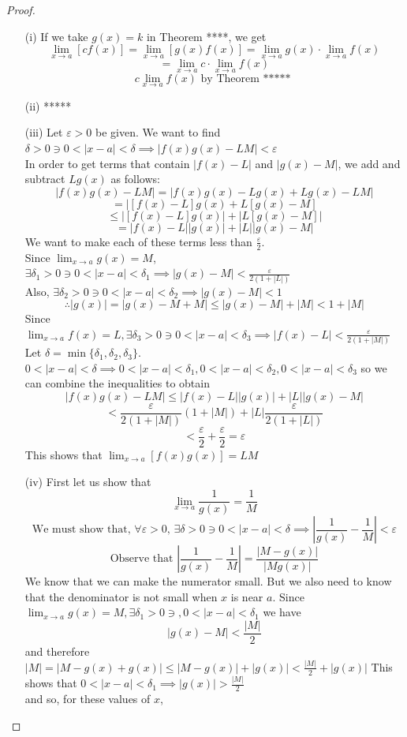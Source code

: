 \documentclass[10pt]{report}
\newcommand{\eps}{\varepsilon}
\begin{document}
\begin{proof}
\begin{itemize}
\item[(i)] If we take $g(x)=k$ in Theorem ****, we get
$$\lim_{x\to a}[cf(x)] =\lim_{x\to a}[g(x)f(x)] =\lim_{x\to a}g(x) \cdot\lim_{x\to a}f(x)$$
$$=\lim_{x\to a}c \cdot\lim_{x\to a}f(x)$$
$$c\lim_{x\to a}f(x)\text{ by Theorem ***** }$$
\item[(ii)]*****
\item[(iii)] Let $\eps>0$ be given. We want to find $\delta>0\ni 0<|x-a| < \delta \implies |f(x)g(x)-LM|<\eps$\\
In order to get terms that contain $|f(x)-L|$ and $|g(x)-M|$, we add and subtract $Lg(x)$ as follows:
$$|f(x)g(x)-LM|=|f(x)g(x)-Lg(x)+Lg(x)-LM|$$
$$=|[f(x)-L]g(x)+L[g(x)-M]$$
$$\leq |[f(x)-L]g(x)|+|L[g(x)-M]|$$
$$=|f(x)-L||g(x)|+|L||g(x)-M|$$
We want to make each of these terms less than $\frac{\eps}{2}$.\\
Since $\lim_{x\to a}g(x)=M$, $\exists\delta_1>0\ni 0<|x-a|<\delta_1\implies |g(x)-M|<\frac{\eps}{2(1+|L|)}$\\
Also, $\exists \delta_2>0\ni 0<|x-a|<\delta_2\implies |g(x)-M|<1$\\
$$\therefore |g(x)|=|g(x)-M+M|\leq |g(x)-M|+|M|<1+|M|$$
Since $\lim_{x\to a}f(x)=L, \exists\delta_3>0\ni 0<|x-a|<\delta_3 \implies |f(x)-L|<\frac{\eps}{2(1+|M|)}$\\
Let $\delta=\min\{\delta_1,\delta_2, \delta_3\}$. $0<|x-a|<\delta\implies 0<|x-a|<\delta_1, 0<|x-a|<\delta_2, 0<|x-a|<\delta_3$ so we can combine the inequalities to obtain
$$|f(x)g(x)-LM|\leq |f(x)-L||g(x)|+|L||g(x)-M|$$
$$<\frac{\eps}{2(1+|M|)}(1+|M|)+|L|\frac{\eps}{2(1+|L|)}$$
$$<\frac{\eps}{2}+\frac{\eps}{2}=\eps$$
This shows that $\lim_{x\to a}[f(x)g(x)]=LM$ 
\item[(iv)] First let us show that
$$\lim_{x\to a}\frac{1}{g(x)}=\frac{1}{M}$$
$$\text{We must show that, } \forall\eps>0\text{, }\exists \delta>0\ni 0<|x-a|<\delta \implies \left|\frac{1}{g(x)}-\frac{1}{M} \right|<\eps$$
$$\text{Observe that }\left|\frac{1}{g(x)}-\frac{1}{M} \right|=\frac{|M-g(x)|}{|Mg(x)|}$$
We know that we can make the numerator small. But we also need to know that the denominator is not small when $x$ is near $a$. Since $\lim_{x\to a}g(x)=M, \exists\delta_1>0 \ni, 0<|x-a|< \delta_1$ we have
$$|g(x)-M|<\frac{|M|}{2}$$
and therefore $|M|=|M-g(x)+g(x)|\leq |M-g(x)|+|g(x)| < \frac{|M|}{2}+|g(x)|$
This shows that $0<|x-a|<\delta_1\implies |g(x)|>\frac{|M|}{2}$\\
and so, for these values of $x$,

\end{itemize}
\end{proof}
\end{document}
